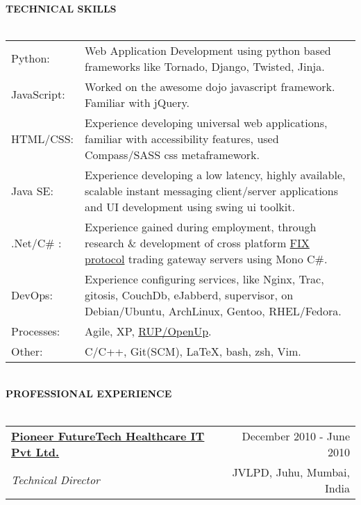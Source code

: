 \documentclass[10pt]{article}
\makeatletter
\newcommand{\lineunder}{\vspace*{-10pt} \\ \hspace*{-18pt} \hrulefill \vspace{2pt}\\}
\newcommand{\header}[1]{{\hspace*{-15pt}\vspace*{-0pt}\\ \uppercase{\textbf {#1}}}  \lineunder}
\newcommand{\employer}[4]{ 
        \vspace*{6pt}
	\begin{tabular*}{\textwidth}{l@{\extracolsep{\fill}}r}
	\textbf{#1} & #2 \\
                #3  & #4 \\ 
	\end{tabular*}
}
\makeatother
\begin{document}
\header{Technical Skills}
\vspace{2pt}
\begin{tabular*}{\textwidth}{p{3cm}p{}}
    Python: & Web Application Development using python based frameworks like Tornado, Django, Twisted, Jinja.  \\
    JavaScript: & Worked on the awesome dojo javascript framework. Familiar with jQuery. \\
    HTML/CSS: & Experience developing universal web applications, familiar with accessibility features, used Compass/SASS css metaframework. \\
    Java SE: & Experience developing a low latency, highly available, scalable instant messaging client/server applications and UI development using swing ui toolkit. \\
    .Net/C\# : & Experience gained during employment, through research \& development of cross platform \href{http://en.wikipedia.org/wiki/FIX_protocol}{FIX protocol} trading gateway servers using Mono C\#. \\
    DevOps: & Experience configuring services, like Nginx, Trac, gitosis, CouchDb, eJabberd, supervisor, on Debian/Ubuntu, ArchLinux, Gentoo, RHEL/Fedora. \\
    Processes: & Agile, XP, \href{http://en.wikipedia.org/wiki/Unified\_process}{RUP/OpenUp}. \\
    Other: & C/C++, Git(SCM), \LaTeX, bash, zsh, Vim.\\
\end{tabular*}
\vspace{15pt}
\header{Professional Experience}
\employer{\href{http://www.pfhit.com/}{Pioneer FutureTech Healthcare IT Pvt Ltd.}}{December 2010 - June 2010}{\emph{Technical Director}} {JVLPD, Juhu, Mumbai, India}
\end{document}

